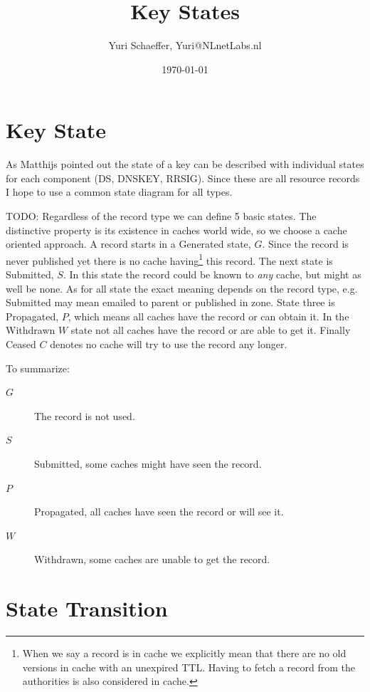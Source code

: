 \documentclass[twoside,english]{article}
\title{Key States}
\author{Yuri Schaeffer, Yuri@NLnetLabs.nl}
\date{\today}
\begin{document}
\maketitle{}

\tableofcontents

\section{Key State}

As Matthijs pointed out the state of a key can be described with individual
states for each component (DS, DNSKEY, RRSIG). Since these are all 
resource records I hope to use a common state diagram for all types.

TODO:
Regardless of the record type we can define 5 basic states. The 
distinctive property is its existence in caches world wide, so we 
choose a cache oriented approach. A record 
starts in a Generated state, $G$. Since the record is never 
published yet there is no cache having\footnote{When we say a record 
is in cache we explicitly mean that there are no old versions in 
cache with an unexpired TTL. Having to fetch a record from the 
authorities is also considered in cache.} this record. The next state is 
Submitted, $S$. In this state the record could be known to \emph
{any} cache, but might as well be none. As for all state the exact 
meaning depends on the record type, e.g. Submitted may mean emailed 
to parent or published in zone. State three is Propagated, $P$, 
which means all caches have the record or can obtain it. In the 
Withdrawn $W$ state not all caches have the record or are able to 
get it. Finally Ceased $C$ denotes no cache will try to use the 
record any longer.

To summarize:

\begin{description}
       \item[$G$] The record is not used.
       \item[$S$] Submitted, some caches might have seen the record.
       \item[$P$] Propagated, all caches have seen the record or will see it.
       \item[$W$] Withdrawn, some caches are unable to get the record.
\end{description} 

\section{State Transition}
\end{document}
